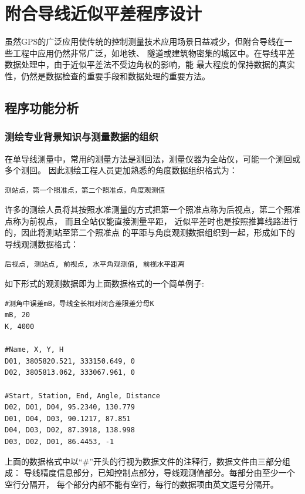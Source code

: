 ﻿%

\chapter{附合导线近似平差程序设计}

虽然GPS的广泛应用使传统的控制测量技术应用场景日益减少，但附合导线在一些工程中应用仍然非常广泛，如地铁、
隧道或建筑物密集的城区中。在导线平差数据处理中，由于近似平差法不受边角权的影响，能
最大程度的保持数据的真实性，仍然是数据检查的重要手段和数据处理的重要方法。

\section{程序功能分析}

\subsection{测绘专业背景知识与测量数据的组织}
在单导线测量中，常用的测量方法是测回法，测量仪器为全站仪，可能一个测回或多个测回。
因此测绘工程人员更加熟悉的角度数据组织格式为：

\begin{verbatim}
测站点，第一个照准点，第二个照准点，角度观测值
\end{verbatim}

许多的测绘人员将其按照水准测量的方式把第一个照准点称为后视点，第二个照准点称为前视点，
而且全站仪能直接测量平距， 近似平差时也是按照推算线路进行的，因此将测站至第二个照准点
的平距与角度观测数据组织到一起，形成如下的导线观测数据格式：

\begin{verbatim}
后视点, 测站点, 前视点, 水平角观测值, 前视水平距离
\end{verbatim}

如下形式的观测数据即为上面数据格式的一个简单例子:

\begin{verbatim}
#测角中误差mB，导线全长相对闭合差限差分母K
mB, 20
K, 4000

#Name, X, Y, H
D01, 3805820.521, 333150.649, 0
D02, 3805813.062, 333067.961, 0

#Start, Station, End, Angle, Distance
D02, D01, D04, 95.2340, 130.779
D01, D04, D03, 90.1217, 87.851
D04, D03, D02, 87.3918, 138.998
D03, D02, D01, 86.4453, -1
\end{verbatim}

上面的数据格式中以``\#''开头的行视为数据文件的注释行，数据文件由三部分组成：
导线精度信息部分，已知控制点部分，导线观测值部分。每部分由至少一个空行分隔开，
每个部分内部不能有空行，每行的数据项由英文逗号分隔开。


